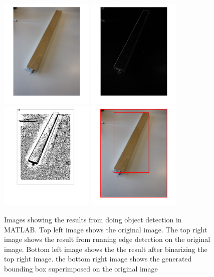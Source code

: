 \begin{figure}[hbtp]
\begin{center}
\includegraphics[width = 0.4\textwidth]{./Images/matlabImage1.png}
\includegraphics[width = 0.4\textwidth]{./Images/matlabImage2.png}
\includegraphics[width = 0.4\textwidth]{./Images/matlabImage3.png} 
\includegraphics[width = 0.4\textwidth]{./Images/matlabImage4.png} 
\caption{Images showing the results from doing object detection in MATLAB. Top left image shows the original image. The top right image shows the result from running edge detection on the original image. Bottom left image shows the the result after binarizing the top right image. the bottom right image shows the generated bounding box superimposed on the original image}
\label{fig:matlabImages}
\end{center}
\end{figure}

